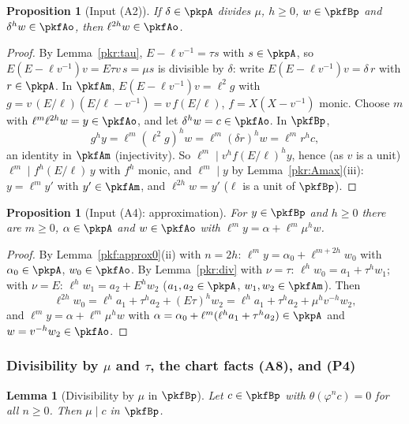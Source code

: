 \documentclass[10pt]{amsart}
\newtheorem{proposition}[theorem]{Proposition}
\newtheorem{lemma}[theorem]{Lemma}
\theoremstyle{definition}
\theoremstyle{remark}
\begin{document}
\begin{proposition}[Input (A2)]\label{pkr:I2}
If $\delta\in\pkpA$ divides $\mu$, $h\ge0$, $w\in\pkfBp$ and $\delta^hw\in\pkfAo$, then $\ell^{2h}w\in\pkfAo$.
\end{proposition}

\begin{proof}
By Lemma~\ref{pkr:tau}, $E-\ell v^{-1}=\tau s$ with $s\in\pkpA$, so $E(E-\ell v^{-1})v=E\tau v\,s=\mu s$
is divisible by $\delta$: write $E(E-\ell v^{-1})v=\delta\,r$ with $r\in\pkpA$. In $\pkfAm$,
$E(E-\ell v^{-1})v=\ell^2g$ with $g=v\,(E/\ell)(E/\ell-v^{-1})=v\,f(E/\ell)$, $f=X(X-v^{-1})$ monic.
Choose $m$ with $\ell^m\ell^{2h}w=y\in\pkfAo$, and let $\delta^hw=c\in\pkfAo$. In $\pkfBp$,
\[g^hy=\ell^m(\ell^2g)^hw=\ell^m(\delta r)^hw=\ell^mr^hc,\]
an identity in $\pkfAm$ (injectivity). So $\ell^m\mid v^hf(E/\ell)^hy$, hence (as $v$ is a unit)
$\ell^m\mid f^h(E/\ell)\,y$ with $f^h$ monic, and $\ell^m\mid y$ by Lemma~\ref{pkr:Amax}(iii): $y=\ell^my'$
with $y'\in\pkfAm$, and $\ell^{2h}w=y'$ ($\ell$ is a unit of $\pkfBp$).
\end{proof}

\begin{proposition}[Input (A4): approximation]\label{pkr:I4}
For $y\in\pkfBp$ and $h\ge0$ there are $m\ge0$, $\alpha\in\pkpA$ and $w\in\pkfAo$ with
$\ell^my=\alpha+\ell^m\mu^hw$.
\end{proposition}

\begin{proof}
By Lemma~\ref{pkf:approx0}(ii) with $n=2h$: $\ell^my=\alpha_0+\ell^{m+2h}w_0$ with $\alpha_0\in\pkpA$,
$w_0\in\pkfAo$. By Lemma~\ref{pkr:div} with $\nu=\tau$: $\ell^hw_0=a_1+\tau^hw_1$; with $\nu=E$:
$\ell^hw_1=a_2+E^hw_2$ ($a_1,a_2\in\pkpA$, $w_1,w_2\in\pkfAm$). Then
\[\ell^{2h}w_0=\ell^ha_1+\tau^ha_2+(E\tau)^hw_2=\ell^ha_1+\tau^ha_2+\mu^hv^{-h}w_2,\]
and $\ell^my=\alpha+\ell^m\mu^hw$ with $\alpha=\alpha_0+\ell^m(\ell^ha_1+\tau^ha_2)\in\pkpA$ and
$w=v^{-h}w_2\in\pkfAo$.
\end{proof}

\subsubsection{Divisibility by $\mu$ and $\tau$, the chart facts (A8), and (P4)}\label{pkr:ss-chart}

\begin{lemma}[Divisibility by $\mu$ in $\pkfBp$]\label{pkr:mu-Bplus}
Let $c\in\pkfBp$ with $\theta(\varphi^nc)=0$ for all $n\ge0$. Then $\mu\mid c$ in $\pkfBp$.
\end{lemma}
\end{document}
